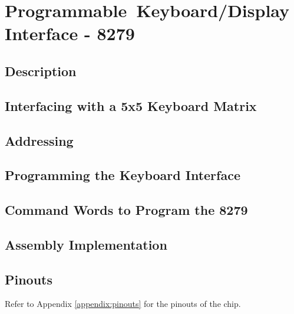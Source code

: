 \newpage
\section{Programmable Keyboard/Display Interface - 8279}

    \subsection{Description}

    \subsection{Interfacing with a 5x5 Keyboard Matrix}

    \subsection{Addressing}

    \subsection{Programming the Keyboard Interface}

    \subsection{Command Words to Program the 8279}

    \subsection{Assembly Implementation}

    \subsection{Pinouts}
    Refer to Appendix \ref{appendix:pinouts} for the pinouts of the chip.
